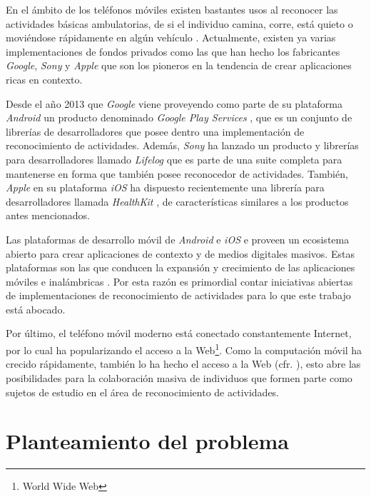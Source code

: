 En el ámbito de los teléfonos móviles existen bastantes usos al reconocer
las actividades básicas ambulatorias, de si el individuo camina, corre,
está quieto o moviéndose rápidamente en algún vehículo \cite{campuzano2015}
\cite{googlio2013}. Actualmente, existen ya varias implementaciones
de fondos privados como las que han hecho los fabricantes \emph{Google},
\emph{Sony} y \emph{Apple} que son los pioneros en la tendencia de
crear aplicaciones ricas en contexto.

Desde el año 2013 que \emph{Google} viene proveyendo como parte de
su plataforma \emph{Android} \cite{google2005and}
un producto denominado \emph{Google Play Services} \cite{googl2016loc},
que es un conjunto de librerías de desarrolladores que posee dentro
una implementación de reconocimiento de actividades. Además, \emph{Sony}
ha lanzado un producto y librerías para desarrolladores llamado \emph{Lifelog}
\cite{sony2016act} que es parte de una suite completa para mantenerse
en forma que también posee reconocedor de actividades. También, \emph{Apple}
en su plataforma \emph{iOS} \cite{apple2007ios}
ha dispuesto recientemente una librería para desarrolladores llamada
\emph{HealthKit} \cite{healthkit2016}, de características similares
a los productos antes mencionados. 

Las plataformas de desarrollo móvil de \emph{Android} e \emph{iOS}
e\emph{ }proveen un ecosistema abierto para crear aplicaciones de
contexto y de medios digitales masivos. Estas plataformas son las
que conducen la expansión y crecimiento de las aplicaciones móviles
e inalámbricas \cite{Tanenbaum2010}. Por esta razón es primordial
contar iniciativas abiertas de implementaciones de reconocimiento
de actividades para lo que este trabajo está abocado.

Por último, el teléfono móvil moderno está conectado constantemente
Internet, por lo cual ha popularizando el acceso a la Web\footnote{World Wide Web}.
Como la computación móvil ha crecido rápidamente, también lo ha hecho
el acceso a la Web (cfr. \cite{nyt2008iph}), esto abre las posibilidades
para la colaboración masiva de individuos que formen parte como sujetos
de estudio en el área de reconocimiento de actividades.

\section{Planteamiento del problema}

